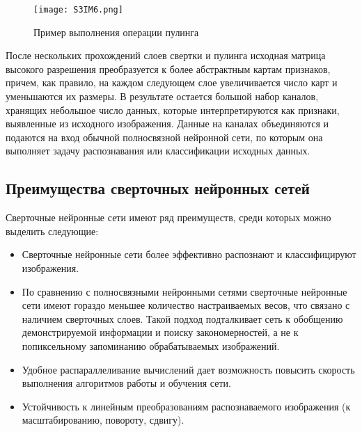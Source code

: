 \begin{figure}[h!]
    \centering
    \texttt{[image: S3IM6.png]}
    \caption{Пример выполнения операции пулинга}
    \label{fig:section3:pooling}
\end{figure}

После нескольких прохождений слоев свертки и пулинга исходная матрица
высокого разрешения преобразуется к более абстрактным картам признаков,
причем, как правило, на каждом следующем слое 
увеличивается число карт и уменьшаются их размеры.
В результате остается большой набор каналов, хранящих небольшое 
число данных, которые интерпретируются как признаки, выявленные
из исходного изображения.
Данные на каналах объединяются и подаются на вход 
обычной полносвязной нейронной сети, 
по которым она выполняет задачу 
распознавания или классификации исходных данных.

\subsection{Преимущества сверточных нейронных сетей}

Сверточные нейронные сети имеют ряд преимуществ,
среди которых можно выделить следующие:

\begin{itemize}
    \item Сверточные нейронные сети более эффективно распознают
    и классифицируют изображения.

    \item По сравнению с полносвязными нейронными сетями
    сверточные нейронные сети имеют гораздо меньшее количество
    настраиваемых весов, что связано с наличием сверточных слоев.
    Такой подход подталкивает сеть к обобщению демонстрируемой
    информации и поиску закономерностей, 
    а не к попиксельному запоминанию обрабатываемых изображений.

    \item Удобное распараллеливание вычислений дает возможность
    повысить скорость выполнения алгоритмов работы и обучения сети.

    \item Устойчивость к линейным преобразованиям
    распознаваемого изображения (к масштабированию, повороту, сдвигу).
\end{itemize}
